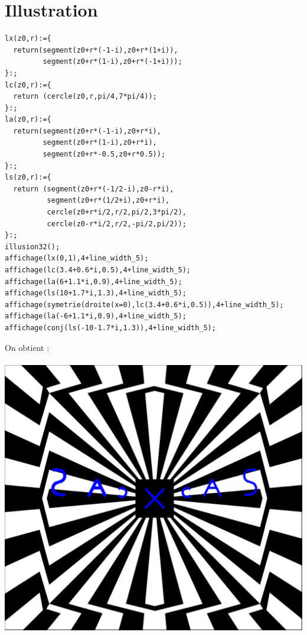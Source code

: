 \documentclass[a4paper,11pt]{book}
\begin{document}
\section{Illustration}
\begin{verbatim}
lx(z0,r):={ 
  return(segment(z0+r*(-1-i),z0+r*(1+i)),
         segment(z0+r*(1-i),z0+r*(-1+i)));  
}:;
lc(z0,r):={ 
  return (cercle(z0,r,pi/4,7*pi/4));  
}:;
la(z0,r):={ 
  return(segment(z0+r*(-1-i),z0+r*i),
         segment(z0+r*(1-i),z0+r*i),
         segment(z0+r*-0.5,z0+r*0.5));
}:;
ls(z0,r):={ 
  return (segment(z0+r*(-1/2-i),z0-r*i),
          segment(z0+r*(1/2+i),z0+r*i),
          cercle(z0+r*i/2,r/2,pi/2,3*pi/2),
          cercle(z0-r*i/2,r/2,-pi/2,pi/2));  
}:;
illusion32();
affichage(lx(0,1),4+line_width_5);
affichage(lc(3.4+0.6*i,0.5),4+line_width_5);
affichage(la(6+1.1*i,0.9),4+line_width_5);
affichage(ls(10+1.7*i,1.3),4+line_width_5);
affichage(symetrie(droite(x=0),lc(3.4+0.6*i,0.5)),4+line_width_5);
affichage(la(-6+1.1*i,0.9),4+line_width_5);
affichage(conj(ls(-10-1.7*i,1.3)),4+line_width_5);
\end{verbatim}
On obtient :\\
\ \\
\includegraphics[width=\textwidth]{illusioncas}
\newpage
\printindex
\newpage
\tableofcontents
\end{document}
